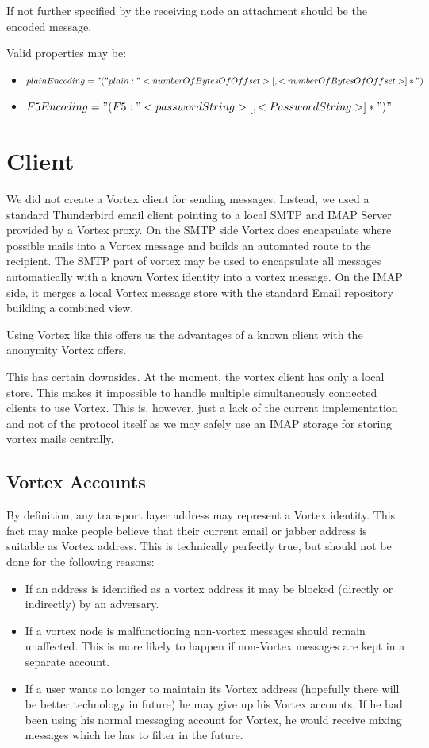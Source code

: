 If not further specified by the receiving node an attachment should be the encoded message. 

Valid properties may be:
\begin{itemize}
	\item $plainEncoding="("plain:"<numberOfBytesOfOffset>[,<numberOfBytesOfOffset>]*")$
	\item $F5Encoding="(F5:"<passwordString>[,<PasswordString>]*")"$
\end{itemize}

\section{Client}
We did not create a Vortex client for sending messages. Instead, we used a standard Thunderbird email client pointing to a local SMTP and IMAP Server provided by a Vortex proxy. On the SMTP side Vortex does encapsulate where possible mails into a Vortex message and builds an automated route to the recipient. The SMTP part of vortex may be used to encapsulate all messages automatically with a known Vortex identity into a vortex message. On the IMAP side, it merges a local Vortex message store with the standard Email repository building a combined view.

Using Vortex like this offers us the advantages of a known client with the anonymity Vortex offers.

This has certain downsides. At the moment, the vortex client has only a local store. This makes it impossible to handle multiple simultaneously connected clients to use Vortex. This is, however, just a lack of the current implementation and not of the protocol itself as we may safely use an IMAP storage for storing vortex mails centrally.

\subsection{Vortex Accounts}
By definition, any transport layer address may represent a Vortex identity. This fact may make people believe that their current email or jabber address is suitable as Vortex address. This is technically perfectly true, but should not be done for the following reasons:

\begin{itemize}
	\item If an address is identified as a vortex address it may be blocked (directly or indirectly) by an adversary.
	\item If a vortex node is malfunctioning non-vortex messages should remain unaffected. This is more likely to happen if non-Vortex messages are kept in a separate account.
	\item If a user wants no longer to maintain its Vortex address (hopefully there will be better technology in future) he may give up his Vortex accounts. If he had been using his normal messaging account for Vortex, he would receive mixing messages which he has to filter in the future.
\end{itemize}

